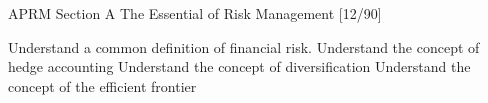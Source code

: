 APRM Section A The Essential of Risk Management
[12/90]

Understand a common definition of financial risk.
Understand the concept of hedge accounting
Understand the concept of diversification
Understand the concept of the efficient frontier
